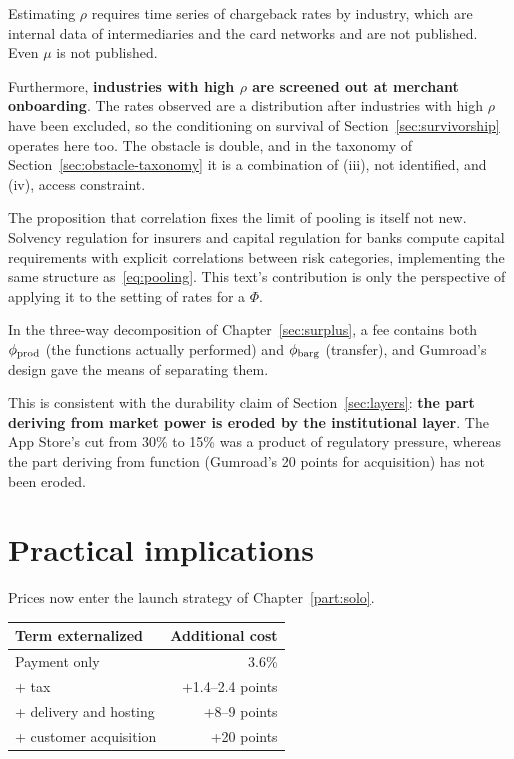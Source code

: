\begin{remark}
\label{rem:predJ-infeasible}
Estimating $\rho$ requires time series of chargeback rates by industry, which are internal
data of intermediaries and the card networks and are not published. Even $\mu$ is not
published.

Furthermore, \textbf{industries with high $\rho$ are screened out at merchant onboarding}.
The rates observed are a distribution after industries with high $\rho$ have been excluded,
so the conditioning on survival of Section~\ref{sec:survivorship} operates here too. The
obstacle is double, and in the taxonomy of Section~\ref{sec:obstacle-taxonomy} it is a
combination of (iii), not identified, and (iv), access constraint.

The proposition that correlation fixes the limit of pooling is itself not new. Solvency
regulation for insurers and capital regulation for banks compute capital requirements with
explicit correlations between risk categories, implementing the same structure
as~\eqref{eq:pooling}. This text's contribution is only the perspective of applying it to the
setting of rates for a $\Phi$.
\end{remark}
In the three-way decomposition of Chapter~\ref{sec:surplus}, a fee contains both
$\phi_{\rm prod}$ (the functions actually performed) and $\phi_{\rm barg}$ (transfer), and
Gumroad's design gave the means of separating them.

This is consistent with the durability claim of Section~\ref{sec:layers}:
\textbf{the part deriving from market power is eroded by the institutional layer}.
The App Store's cut from 30\% to 15\% was a product of regulatory pressure, whereas the part
deriving from function (Gumroad's 20 points for acquisition) has not been eroded.

\section{Practical implications}

Prices now enter the launch strategy of Chapter~\ref{part:solo}.

\begin{center}
\begin{tabular}{@{}lr@{}}
\toprule
Term externalized & Additional cost \\
\midrule
Payment only & 3.6\% \\
+ tax & +1.4--2.4 points \\
+ delivery and hosting & +8--9 points \\
+ customer acquisition & +20 points \\
\bottomrule
\end{tabular}
\label{tab:externalization-cost}
\end{center}


